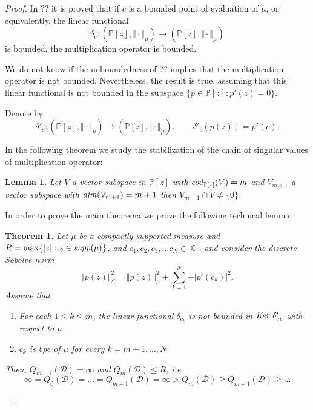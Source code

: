 \documentclass[12pt]{amsart}
\theoremstyle{definition}
\theoremstyle{plain}
\newtheorem{theorem}{Theorem}
\newtheorem{lem}{Lemma}
\theoremstyle{remark}
\DeclareMathOperator{\CC}{\mathbb C}
\begin{document}
\begin{proof}
\noindent In ?? it is proved that if $c$ is a bounded point of evaluation of $\mu$, or equivalently, the linear functional
$$
\delta_c: (\mathbb{P}[z], \Vert \cdot \Vert_{\mu})\to  (\mathbb{P}[z], \Vert \cdot \Vert_{\mu})
$$
\noindent is bounded, the multiplication operator is bounded. 

\noindent We do not know if the unboundedness of ?? implies that the multiplication operator is not bounded. Nevertheless, the result is true, assuming that this linear functional is not bounded in the subspace $\{p\in \mathbb{P}[z]: p'(z)=0\}$. 

\noindent Denote by 
$$
\delta'_c: (\mathbb{P}[z], \Vert \cdot \Vert_{\mu})\to  (\mathbb{P}[z], \Vert \cdot \Vert_{\mu}), \qquad \delta'_c(p(z))=p'(c).
$$

\noindent In the following theorem we study the stabilization of the chain of singular values of multiplication operator: 


\begin{lem} Let $V$ a vector subspace in $\mathbb{P}[z]$ with ${\it cod}_{\mathbb{P}[z]}(V)=m$ and $V_{m+1}$ a vector subspace with ${\it dim}(V_{m+1})=m+1$ then $V_{m+1}\cap V\neq \{0\}$.
\end{lem}

\noindent In order to prove the main theorema we prove the following technical lemma: 




\begin{theorem}
     Let $\mu$ be a  compactly supported measure and $R= \max \{\vert z \vert : z\in {\it supp}(\mu)\}$, 
and $c_1,c_2,c_3,\dots c_{N}\in \CC$. and consider the discrete Sobolve norm 
$$
\Vert p(z) \Vert^2_S=\Vert p(z) \Vert^2_{\mu}+\sum_{k=1}^{N} +\vert p'(c_k)\vert^2.
$$
\noindent Assume that 
\begin{enumerate}
    \item For each $ 1\leq k \leq m$,  the linear functional $\delta_{c_k}  $ is not bounded in ${\it Ker} \; \delta'_{c_k} $ with respect to $\mu$.
    \item $c_k$ is bpe of $\mu$  for every $k=m+1,\dots,N$. 
\end{enumerate}

\smallskip

\noindent Then, $Q_{m-1}(\mathcal{D})=\infty$ and $Q_{m}(\mathcal{D})\leq R$, i.e. 
$$
\infty = Q_{0}(\mathcal{D})= \dots = Q_{m-1}(\mathcal{D})=\infty > Q_{m}(\mathcal{D}) \geq Q_{m+1}(\mathcal{D}) \geq \dots  
$$
\end{theorem}






\end{proof}
\end{document}
